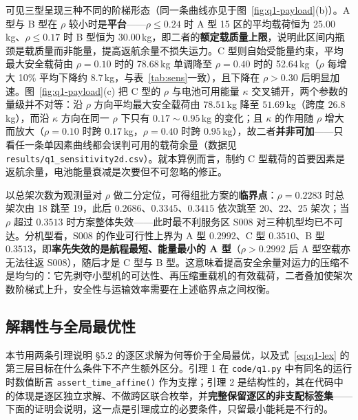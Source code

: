 可见三型呈现三种不同的阶梯形态（同一条曲线亦见于图~\ref{fig:q1-payload}(b)）。A 型与 B 型在 $\rho$ 较小时是\textbf{平台}——$\rho\le0.24$ 时 A 型 15 区的平均载荷恒为 25.00\,kg、$\rho\le0.17$ 时 B 型恒为 30.00\,kg，即二者的\textbf{额定载质量上限}，说明此区间内瓶颈是载质量而非能量，提高返航余量不损失运力。C 型则自始受能量约束，平均最大安全载荷由 $\rho=0.10$ 时的 78.68\,kg 单调降至 $\rho=0.40$ 时的 52.64\,kg（$\rho$ 每增大 10\% 平均下降约 8.7\,kg，与表~\ref{tab:sens}一致），且下降在 $\rho>0.30$ 后明显加速。图~\ref{fig:q1-payload}(c) 把 C 型的 $\rho$ 与电池可用能量 $\kappa$ 交叉铺开，两个参数的量级并不对等：沿 $\rho$ 方向平均最大安全载荷由 $78.51$\,kg 降至 $51.69$\,kg（跨度 $26.8$\,kg），而沿 $\kappa$ 方向在同一 $\rho$ 下只有 $0.17\sim0.95$\,kg 的变化；且 $\kappa$ 的作用随 $\rho$ 增大而放大（$\rho=0.10$ 时跨 $0.17$\,kg，$\rho=0.40$ 时跨 $0.95$\,kg），故二者\textbf{并非可加}——只看任一条单因素曲线都会误判可用的载荷余量（数据见 \texttt{results/q1\_sensitivity2d.csv}）。就本算例而言，制约 C 型载荷的首要因素是返航余量，电池能量衰减是次要但不可忽略的修正。

以总架次数为观测量对 $\rho$ 做二分定位，可得组批方案的\textbf{临界点}：$\rho=0.2283$ 时总架次由 18 跳至 19，此后 $0.2686$、$0.3345$、$0.3415$ 依次跳至 20、22、25 架次；当 $\rho$ 超过 $0.3513$ 时方案整体失效——此时最不利服务区 S008 对三种机型均已不可达。分机型看，S008 的作业可行性上界为 A 型 $0.2992$、C 型 $0.3510$、B 型 $0.3513$，即\textbf{率先失效的是航程最短、能量最小的 A 型}（$\rho>0.2992$ 后 A 型空载亦无法往返 S008），随后才是 C 型与 B 型。这意味着提高安全余量对运力的压缩不是均匀的：它先剥夺小型机的可达性、再压缩重载机的有效载荷，二者叠加使架次数阶梯式上升，安全性与运输效率需要在上述临界点之间权衡。

\subsection{解耦性与全局最优性}

本节用两条引理说明 §5.2 的逐区求解为何等价于全局最优，以及式~\eqref{eq:q1-lex} 的第三层目标在什么条件下不产生额外区分。引理 1 在 \texttt{code/q1.py} 中有同名的运行时数值断言 \texttt{assert\_time\_affine()} 作为支撑；引理 2 是结构性的，其在代码中的体现是逐区独立求解、不做跨区联合枚举，并\textbf{完整保留逐区的非支配标签集}——下面的证明会说明，这一点是引理成立的必要条件，只留最小能耗是不行的。

